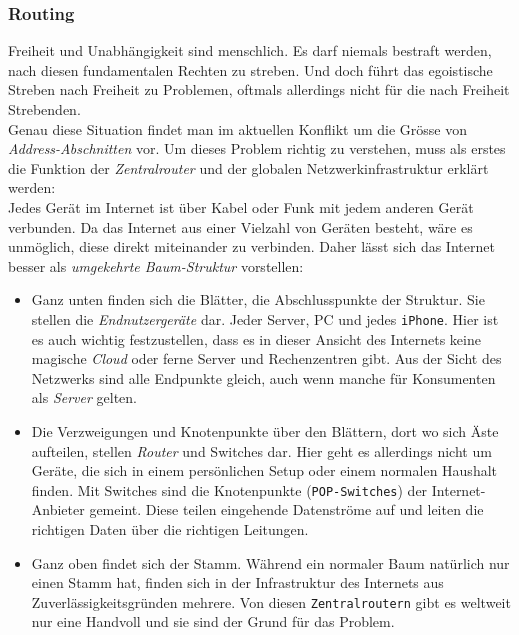 \documentclass[11pt]{article}
\begin{document}
\subsubsection{Routing}
\label{sec:org0968afc}
\noindent Freiheit und Unabhängigkeit sind menschlich. Es darf niemals
bestraft werden, nach diesen fundamentalen Rechten zu streben. Und
doch führt das egoistische Streben nach Freiheit zu Problemen, oftmals
allerdings nicht für die nach Freiheit Strebenden.\\

\noindent Genau diese Situation findet man im aktuellen Konflikt um
die Grösse von \emph{Address-Abschnitten} vor. Um dieses Problem richtig zu
verstehen, muss als erstes die Funktion der \emph{Zentralrouter} und der
globalen Netzwerkinfrastruktur erklärt werden:\\

\noindent Jedes Gerät im Internet ist über Kabel oder Funk mit jedem
anderen Gerät verbunden. Da das Internet aus einer Vielzahl von
Geräten besteht, wäre es unmöglich, diese direkt miteinander zu
verbinden. Daher lässt sich das Internet besser als \emph{umgekehrte
Baum-Struktur} vorstellen:
\begin{itemize}
\item Ganz unten finden sich die Blätter, die Abschlusspunkte der
Struktur. Sie stellen die \emph{Endnutzergeräte} dar. Jeder Server, PC und
jedes \texttt{iPhone}. Hier ist es auch wichtig festzustellen, dass es in
dieser Ansicht des Internets keine magische \emph{Cloud} oder ferne Server
und Rechenzentren gibt. Aus der Sicht des Netzwerks sind alle
Endpunkte gleich, auch wenn manche für Konsumenten als \emph{Server}
gelten.
\item Die Verzweigungen und Knotenpunkte über den Blättern, dort wo sich
Äste aufteilen, stellen \emph{Router} und Switches dar. Hier geht es
allerdings nicht um Geräte, die sich in einem persönlichen Setup
oder einem normalen Haushalt finden. Mit Switches sind die
Knotenpunkte (\texttt{POP-Switches}) der Internet-Anbieter gemeint. Diese
teilen eingehende Datenströme auf und leiten die richtigen Daten
über die richtigen Leitungen.
\item Ganz oben findet sich der Stamm. Während ein normaler Baum natürlich
nur einen Stamm hat, finden sich in der Infrastruktur des Internets
aus Zuverlässigkeitsgründen mehrere. Von diesen \texttt{Zentralroutern} gibt
es weltweit nur eine Handvoll und sie sind der Grund für das
Problem.
\end{itemize}
\end{document}
